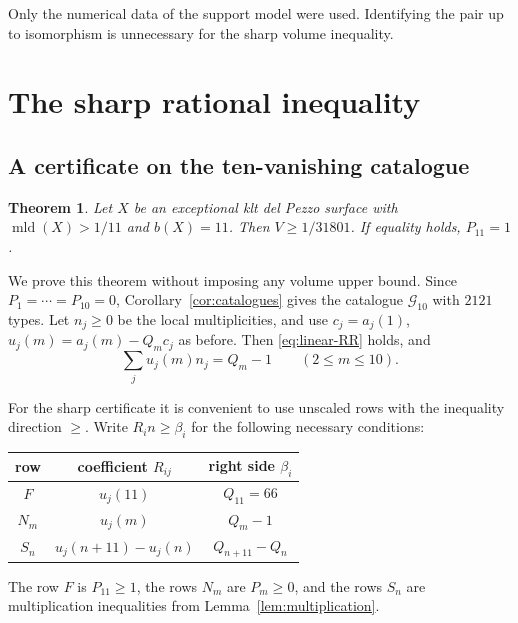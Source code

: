 \documentclass[12pt,a4paper]{article}
\numberwithin{equation}{section}
\newtheorem{theorem}{Theorem}[section]
\theoremstyle{definition}
\newcommand{\mld}{\operatorname{mld}}
\newcommand{\ccat}{\mathscr G}
\begin{document}
Only the numerical data of the support model were used.
Identifying the pair up to isomorphism is unnecessary for the
sharp volume inequality.

\section{The sharp rational inequality}\label{sec:sharp}

\subsection{A certificate on the ten-vanishing catalogue}

\begin{theorem}\label{thm:sharp-degree}
Let \(X\) be an exceptional klt del Pezzo surface with
\(\mld(X)>1/11\) and \(b(X)=11\).
Then \(V\geq1/31801\).
If equality holds, \(P_{11}=1\).
\end{theorem}

We prove this theorem without imposing any volume upper bound.
Since \(P_1=\cdots=P_{10}=0\),
Corollary~\ref{cor:catalogues} gives the catalogue \(\ccat_{10}\)
with \(2121\) types.
Let \(n_j\geq0\) be the local multiplicities, and use
\(c_j=a_j(1)\), \(u_j(m)=a_j(m)-Q_mc_j\) as before.
Then \eqref{eq:linear-RR} holds, and
\begin{equation}\label{eq:sharp-equalities}
                 \sum_ju_j(m)n_j=Q_m-1\qquad(2\leq m\leq10).
\end{equation}

For the sharp certificate it is convenient to use unscaled rows
with the inequality direction \(\geq\).
Write \(R_i n\geq\beta_i\) for the following necessary conditions:
\begin{center}
\begin{tabular}{c|c|c}
\toprule
row&coefficient \(R_{ij}\)&right side \(\beta_i\)\\
\midrule
\(F\)&\(u_j(11)\)&\(Q_{11}=66\)\\
\(N_m\)&\(u_j(m)\)&\(Q_m-1\)\\
\(S_n\)&\(u_j(n+11)-u_j(n)\)&\(Q_{n+11}-Q_n\)\\
\bottomrule
\end{tabular}
\end{center}
The row \(F\) is \(P_{11}\geq1\), the rows \(N_m\) are
\(P_m\geq0\), and the rows \(S_n\) are multiplication inequalities
from Lemma~\ref{lem:multiplication}.
\end{document}
